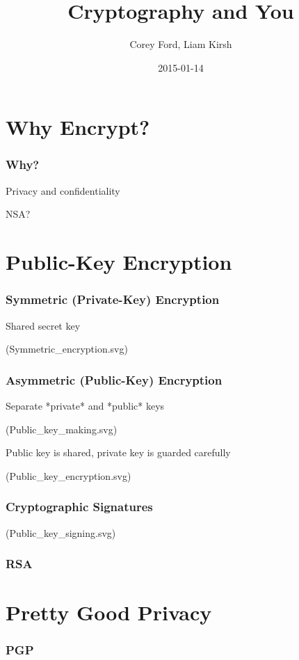 \documentclass{beamer}
\title{Cryptography and You}
\author{Corey Ford, Liam Kirsh}
\institute{The White Hat}
\date{2015-01-14}
\begin{document}
\frame{\titlepage}

\section{Why Encrypt?}

\begin{frame}
  \frametitle{Why?}

Privacy and confidentiality

NSA?

\end{frame}

\section{Public-Key Encryption}

\begin{frame}
  \frametitle{Symmetric (Private-Key) Encryption}

Shared secret key

(Symmetric\_encryption.svg)

\end{frame}

\begin{frame}
  \frametitle{Asymmetric (Public-Key) Encryption}

Separate *private* and *public* keys

(Public\_key\_making.svg)

Public key is shared, private key is guarded carefully

(Public\_key\_encryption.svg)

\end{frame}

\begin{frame}
  \frametitle{Cryptographic Signatures}

(Public\_key\_signing.svg)

\end{frame}

\begin{frame}
  \frametitle{RSA}
\end{frame}

\section{Pretty Good Privacy}

\begin{frame}
  \frametitle{PGP}
\end{frame}
\end{document}
